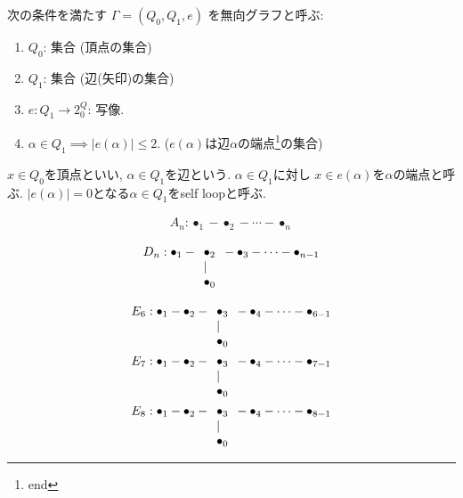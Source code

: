 \begin{definition}
  次の条件を満たす
  $\Gamma=(Q_0,Q_1,e)$
  を無向グラフと呼ぶ:
  \begin{enumerate}
  \item $Q_0$: 集合 (頂点の集合)
  \item $Q_1$: 集合 (辺(矢印)の集合)
  \item $e\colon Q_1\to 2^Q_0$: 写像.
  \item $\alpha\in Q_1\implies |e(\alpha)|\leq 2$.
    ($e(\alpha)$は辺$\alpha$の端点\footnote{end}の集合)
  \end{enumerate}
  $x\in Q_0$を頂点といい,
  $\alpha\in Q_1$を辺という.
  $\alpha\in Q_1$に対し
  $x\in e(\alpha)$を$\alpha$の端点と呼ぶ.
  $|e(\alpha)|=0$となる$\alpha\in Q_1$をself loopと呼ぶ.
\end{definition}
\begin{example}
  \begin{align*}
    A_n : \bullet_1 -\bullet_2-\cdots -\bullet_n
  \end{align*}
\end{example}
\begin{example}
  \begin{align*}
    D_n : \bullet_1 -\begin{array}[t]{l}\bullet_2\\|\\\bullet_0\end{array}-\bullet_3-\cdots -\bullet_{n-1}
  \end{align*}
\end{example}
\begin{example}
  \begin{align*}
    E_6 : \bullet_1-\bullet_2 -\begin{array}[t]{l}\bullet_3\\|\\\bullet_0\end{array}-\bullet_4-\cdots -\bullet_{6-1}\\
    E_7 : \bullet_1-\bullet_2 -\begin{array}[t]{l}\bullet_3\\|\\\bullet_0\end{array}-\bullet_4-\cdots -\bullet_{7-1}\\
    E_8 : \bullet_1-\bullet_2 -\begin{array}[t]{l}\bullet_3\\|\\\bullet_0\end{array}-\bullet_4-\cdots -\bullet_{8-1}\\
  \end{align*}
\end{example}

